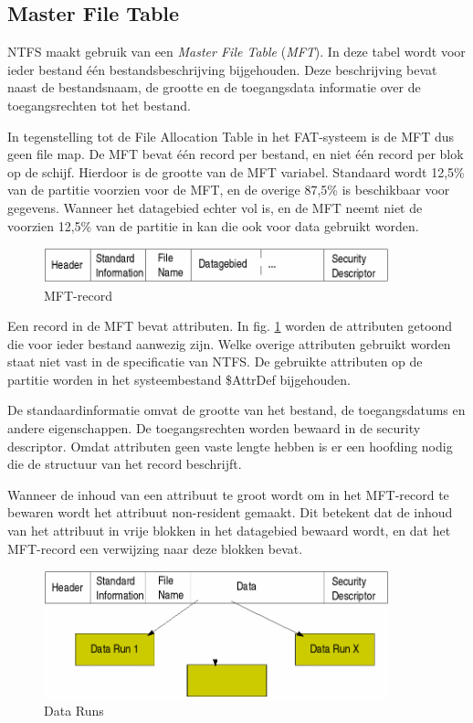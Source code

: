 \subsection{Master File Table}

NTFS maakt gebruik van een \emph{Master File
Table} (\emph{MFT}). In deze tabel wordt
voor ieder bestand \'e\'en bestandsbeschrijving bijgehouden. Deze
beschrijving bevat naast de bestandsnaam, de grootte en de
toegangsdata informatie over de toegangsrechten tot het
bestand.

In tegenstelling tot de File Allocation Table in het FAT-systeem
is de MFT dus geen file map. De MFT bevat \'e\'en record per bestand, en
niet \'e\'en record per blok op de schijf. Hierdoor is de grootte van de
MFT variabel. Standaard wordt 12,5\% van de partitie voorzien voor de
MFT, en de overige 87,5\% is beschikbaar voor gegevens. Wanneer het
datagebied echter vol is, en de MFT neemt niet de voorzien 12,5\% van
de partitie in kan die ook voor data gebruikt worden.

\begin{figure}
\begin{center}
\includegraphics[width=100mm]{images/fig0416.png}
\caption{MFT-record}
\label{mftrecord}
\end{center}
\end{figure}

Een record in de MFT bevat attributen. In fig. \ref{mftrecord} worden de
attributen getoond die voor ieder bestand aanwezig zijn. Welke overige attributen
gebruikt worden staat niet vast in de specificatie van NTFS. De
gebruikte attributen op de partitie worden in het systeembestand
\$AttrDef bijgehouden.

De standaardinformatie omvat de grootte van het bestand, de
toegangsdatums en andere eigenschappen. De toegangsrechten worden
bewaard in de security descriptor. Omdat attributen geen vaste lengte
hebben is er een hoofding nodig die de structuur van het record
beschrijft.

Wanneer de inhoud van een attribuut te groot wordt om in het
MFT-record te bewaren wordt het attribuut non-resident gemaakt. Dit
betekent dat de inhoud van het attribuut in vrije blokken in het
datagebied bewaard wordt, en dat het MFT-record een verwijzing naar
deze blokken bevat.

\begin{figure}
\begin{center}
\includegraphics[width=100mm]{images/fig0417.png}
\caption{Data Runs}
\label{dataruns}
\end{center}
\end{figure}

